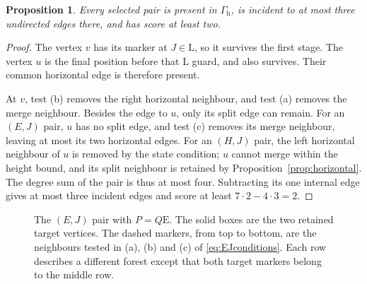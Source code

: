 \documentclass[11pt,a4paper]{article}
\newtheorem{proposition}[theorem]{Proposition}
\theoremstyle{definition}
\theoremstyle{remark}
\newcommand{\E}{\mathrm E}
\newcommand{\LL}{\mathrm L}
\newcommand{\Gh}{\Gamma_{\mathrm h}}
\begin{document}
\begin{proposition}\label{prop:pairs}
Every selected pair is present in $\Gh$, is incident to at most three undirected edges there, and has score at least two.
\end{proposition}
\begin{proof}
The vertex $v$ has its marker at $J\in\LL$, so it survives the first stage. The vertex $u$ is the final position before that $\LL$ guard, and also survives. Their common horizontal edge is therefore present.

At $v$, test (b) removes the right horizontal neighbour, and test (a) removes the merge neighbour. Besides the edge to $u$, only its split edge can remain. For an $(E,J)$ pair, $u$ has no split edge, and test (c) removes its merge neighbour, leaving at most its two horizontal edges. For an $(H,J)$ pair, the left horizontal neighbour of $u$ is removed by the state condition; $u$ cannot merge within the height bound, and its split neighbour is retained by Proposition~\ref{prop:horizontal}. The degree sum of the pair is thus at most four. Subtracting its one internal edge gives at most three incident edges and score at least $7\cdot2-4\cdot3=2$.
\end{proof}

\begin{figure}[htbp]
\centering
{}
\caption{The $(E,J)$ pair with $P=Q\E$. The solid boxes are the two retained target vertices. The dashed markers, from top to bottom, are the neighbours tested in (a), (b) and (c) of \eqref{eq:EJconditions}. Each row describes a different forest except that both target markers belong to the middle row.}\label{fig:pair}
\end{figure}
\end{document}
